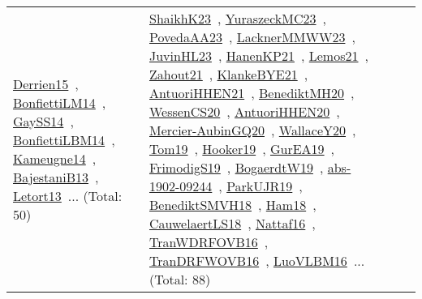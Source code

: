 {\begin{longtable}{lp{3cm}>{\raggedright\arraybackslash}p{6cm}>{\raggedright\arraybackslash}p{6cm}>{\raggedright\arraybackslash}p{8cm}}
\href{works/Derrien15.pdf}{Derrien15}~\cite{Derrien15}, \href{works/BonfiettiLM14.pdf}{BonfiettiLM14}~\cite{BonfiettiLM14}, \href{works/GaySS14.pdf}{GaySS14}~\cite{GaySS14}, \href{works/BonfiettiLBM14.pdf}{BonfiettiLBM14}~\cite{BonfiettiLBM14}, \href{works/Kameugne14.pdf}{Kameugne14}~\cite{Kameugne14}, \href{works/BajestaniB13.pdf}{BajestaniB13}~\cite{BajestaniB13}, \href{works/Letort13.pdf}{Letort13}~\cite{Letort13}... (Total: 50) & \href{works/ShaikhK23.pdf}{ShaikhK23}~\cite{ShaikhK23}, \href{works/YuraszeckMC23.pdf}{YuraszeckMC23}~\cite{YuraszeckMC23}, \href{works/PovedaAA23.pdf}{PovedaAA23}~\cite{PovedaAA23}, \href{works/LacknerMMWW23.pdf}{LacknerMMWW23}~\cite{LacknerMMWW23}, \href{works/JuvinHL23.pdf}{JuvinHL23}~\cite{JuvinHL23}, \href{works/HanenKP21.pdf}{HanenKP21}~\cite{HanenKP21}, \href{works/Lemos21.pdf}{Lemos21}~\cite{Lemos21}, \href{works/Zahout21.pdf}{Zahout21}~\cite{Zahout21}, \href{works/KlankeBYE21.pdf}{KlankeBYE21}~\cite{KlankeBYE21}, \href{works/AntuoriHHEN21.pdf}{AntuoriHHEN21}~\cite{AntuoriHHEN21}, \href{works/BenediktMH20.pdf}{BenediktMH20}~\cite{BenediktMH20}, \href{works/WessenCS20.pdf}{WessenCS20}~\cite{WessenCS20}, \href{works/AntuoriHHEN20.pdf}{AntuoriHHEN20}~\cite{AntuoriHHEN20}, \href{works/Mercier-AubinGQ20.pdf}{Mercier-AubinGQ20}~\cite{Mercier-AubinGQ20}, \href{works/WallaceY20.pdf}{WallaceY20}~\cite{WallaceY20}, \href{works/Tom19.pdf}{Tom19}~\cite{Tom19}, \href{works/Hooker19.pdf}{Hooker19}~\cite{Hooker19}, \href{works/GurEA19.pdf}{GurEA19}~\cite{GurEA19}, \href{works/FrimodigS19.pdf}{FrimodigS19}~\cite{FrimodigS19}, \href{works/BogaerdtW19.pdf}{BogaerdtW19}~\cite{BogaerdtW19}, \href{works/abs-1902-09244.pdf}{abs-1902-09244}~\cite{abs-1902-09244}, \href{works/ParkUJR19.pdf}{ParkUJR19}~\cite{ParkUJR19}, \href{works/BenediktSMVH18.pdf}{BenediktSMVH18}~\cite{BenediktSMVH18}, \href{works/Ham18.pdf}{Ham18}~\cite{Ham18}, \href{works/CauwelaertLS18.pdf}{CauwelaertLS18}~\cite{CauwelaertLS18}, \href{works/Nattaf16.pdf}{Nattaf16}~\cite{Nattaf16}, \href{works/TranWDRFOVB16.pdf}{TranWDRFOVB16}~\cite{TranWDRFOVB16}, \href{works/TranDRFWOVB16.pdf}{TranDRFWOVB16}~\cite{TranDRFWOVB16}, \href{works/LuoVLBM16.pdf}{LuoVLBM16}~\cite{LuoVLBM16}... (Total: 88)\\

\end{longtable}}
